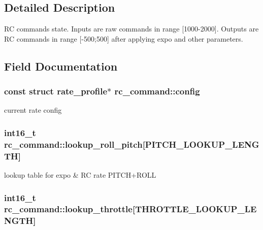 \subsection{Detailed Description}
R\+C commands state. Inputs are raw commands in range \mbox{[}1000-\/2000\mbox{]}. Outputs are R\+C commands in range \mbox{[}-\/500;500\mbox{]} after applying expo and other parameters. 

\subsection{Field Documentation}
\hypertarget{structrc__command_a2529fb1da9d636599d0f01450c6299fb}{
\subsubsection[{config}]{\setlength{\rightskip}{0pt plus 5cm}const struct {\bf rate\+\_\+profile}$\ast$ rc\+\_\+command\+::config}}\label{structrc__command_a2529fb1da9d636599d0f01450c6299fb}


current rate config 

\hypertarget{structrc__command_a6cf67909a0d1e664b5f37cd5321063fa}{
\subsubsection[{lookup\+\_\+roll\+\_\+pitch}]{\setlength{\rightskip}{0pt plus 5cm}int16\+\_\+t rc\+\_\+command\+::lookup\+\_\+roll\+\_\+pitch\mbox{[}{\bf P\+I\+T\+C\+H\+\_\+\+L\+O\+O\+K\+U\+P\+\_\+\+L\+E\+N\+G\+T\+H}\mbox{]}}}\label{structrc__command_a6cf67909a0d1e664b5f37cd5321063fa}


lookup table for expo \& R\+C rate P\+I\+T\+C\+H+\+R\+O\+L\+L 

\hypertarget{structrc__command_a526d9456c67efe8f66373a4f8c5a99c8}{
\subsubsection[{lookup\+\_\+throttle}]{\setlength{\rightskip}{0pt plus 5cm}int16\+\_\+t rc\+\_\+command\+::lookup\+\_\+throttle\mbox{[}{\bf T\+H\+R\+O\+T\+T\+L\+E\+\_\+\+L\+O\+O\+K\+U\+P\+\_\+\+L\+E\+N\+G\+T\+H}\mbox{]}}}\label{structrc__command_a526d9456c67efe8f66373a4f8c5a99c8}


